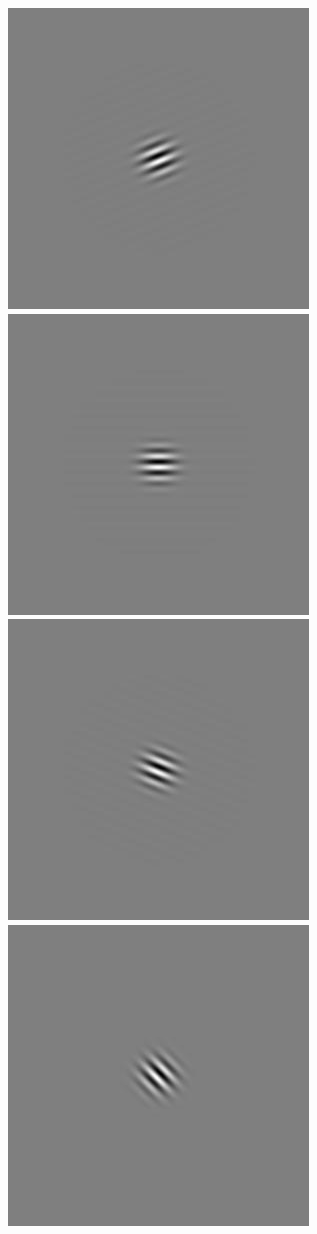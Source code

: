 \begin{figure}
\begin{center}
 \includegraphics[scale=0.1]{ch4/figures/iGabor2_3.jpg}
 \includegraphics[scale=0.1]{ch4/figures/iGabor2_4.jpg}
 \includegraphics[scale=0.1]{ch4/figures/iGabor2_5.jpg}
 \includegraphics[scale=0.1]{ch4/figures/iGabor2_6.jpg}

\end{center}
\end{figure}
